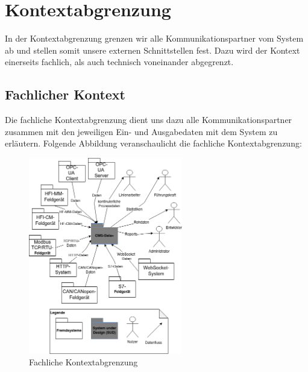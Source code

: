 \chapter{Kontextabgrenzung}
\label{ch:Kontextabgrenzung}
In der Kontextabgrenzung grenzen wir alle Kommunikationspartner vom System ab und stellen somit unsere externen Schnittstellen fest. Dazu wird der Kontext einerseits fachlich, als auch technisch voneinander abgegrenzt.
\section{Fachlicher Kontext}
Die fachliche Kontextabgrenzung dient uns dazu alle Kommunikationspartner zusammen mit den jeweiligen Ein- und Ausgabedaten mit dem System zu erläutern. Folgende Abbildung veranschaulicht die fachliche Kontextabgrenzung:
\begin{figure}[h]
	\centering
	\includegraphics[width=0.6\textwidth]{Graphics/fachliche_kontextabgrenzung.png}
	\caption{Fachliche Kontextabgrenzung}
	\label{fig:fachliche_kontextabgrenzung}
\end{figure}

